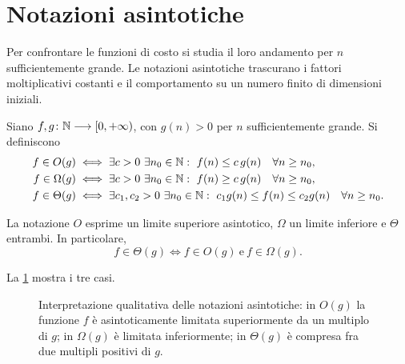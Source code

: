 \section{Notazioni asintotiche}
\label{sec:fi-complessita-asintotica}

Per confrontare le funzioni di costo si studia il loro andamento per
\(n\) sufficientemente grande. Le notazioni asintotiche trascurano i
fattori moltiplicativi costanti e il comportamento su un numero finito
di dimensioni iniziali.

\begin{definition}
\label{def:fi-notazioni-asintotiche}
Siano \(f,g\colon\mathbb{N}\longrightarrow[0,+\infty)\), con \(g(n)>0\)
per \(n\) sufficientemente grande. Si definiscono
\begin{align*}
  f\in O(g)
  &\iff \exists c>0\ \exists n_0\in\mathbb{N}:\
      f(n)\le c\,g(n)\quad\forall n\ge n_0,\\
  f\in\Omega(g)
  &\iff \exists c>0\ \exists n_0\in\mathbb{N}:\
      f(n)\ge c\,g(n)\quad\forall n\ge n_0,\\
  f\in\Theta(g)
  &\iff \exists c_1,c_2>0\ \exists n_0\in\mathbb{N}:\
      c_1g(n)\le f(n)\le c_2g(n)\quad\forall n\ge n_0.
\end{align*}
\end{definition}

La notazione \(O\) esprime un limite superiore asintotico, \(\Omega\)
un limite inferiore e \(\Theta\) entrambi. In particolare,
\[
  f\in\Theta(g)
  \iff f\in O(g)\ \text{e}\ f\in\Omega(g).
\]

La \cref{fig:fi-notazioni-asintotiche} mostra i tre casi.

\begin{figure}[htbp]
  \centering
  
  \caption{Interpretazione qualitativa delle notazioni asintotiche:
  in \(O(g)\) la funzione \(f\) è asintoticamente limitata superiormente
  da un multiplo di \(g\); in \(\Omega(g)\) è limitata inferiormente;
  in \(\Theta(g)\) è compresa fra due multipli positivi di \(g\).}
  \label{fig:fi-notazioni-asintotiche}
\end{figure}



